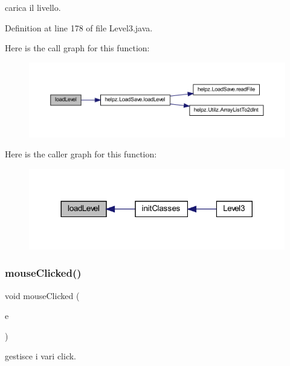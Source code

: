 carica il livello. 



Definition at line 178 of file Level3.\+java.

Here is the call graph for this function\+:
\nopagebreak
\begin{figure}[H]
\begin{center}
\leavevmode
\includegraphics[width=350pt]{classscenes_1_1_level3_a286931cc46e197f4a85af7229fdc29a4_cgraph}
\end{center}
\end{figure}
Here is the caller graph for this function\+:\nopagebreak
\begin{figure}[H]
\begin{center}
\leavevmode
\includegraphics[width=317pt]{classscenes_1_1_level3_a286931cc46e197f4a85af7229fdc29a4_icgraph}
\end{center}
\end{figure}
\mbox{\label{classscenes_1_1_level3_a45d56bd84238e8b56589dfc732e2b2cf}} 
\subsubsection{\texorpdfstring{mouse\+Clicked()}{mouseClicked()}}
{\footnotesize\ttfamily void mouse\+Clicked (\begin{DoxyParamCaption}\item[{Mouse\+Event}]{e }\end{DoxyParamCaption})}



gestisce i vari click. 


